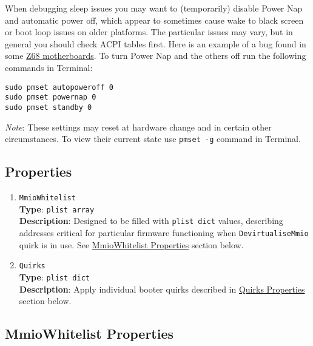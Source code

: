 \documentclass[]{article}
\begin{document}
When debugging sleep issues you may want to (temporarily) disable Power Nap and
automatic power off, which appear to sometimes cause wake to black screen or boot loop
issues on older platforms. The particular issues may vary, but in general you should
check ACPI tables first. Here is an example of a bug found in some
\href{http://www.insanelymac.com/forum/topic/329624-need-cmos-reset-after-sleep-only-after-login/#entry2534645}{Z68 motherboards}.
To turn Power Nap and the others off run the following commands in Terminal:
\begin{lstlisting}[label=powernap, style=ocbash]
sudo pmset autopoweroff 0
sudo pmset powernap 0
sudo pmset standby 0
\end{lstlisting}

\emph{Note}: These settings may reset at hardware change and in certain other circumstances.
To view their current state use \texttt{pmset -g} command in Terminal.

\subsection{Properties}\label{booterprops}

\begin{enumerate}

\item
  \texttt{MmioWhitelist}\\
  \textbf{Type}: \texttt{plist\ array}\\
  \textbf{Description}: Designed to be filled with \texttt{plist\ dict} values,
  describing addresses critical for particular firmware functioning when
  \texttt{DevirtualiseMmio} quirk is in use. See \hyperref[booterpropsmmio]{MmioWhitelist Properties}
  section below.

\item
  \texttt{Quirks}\\
  \textbf{Type}: \texttt{plist\ dict}\\
  \textbf{Description}: Apply individual booter quirks described
  in \hyperref[booterpropsquirks]{Quirks Properties} section below.

\end{enumerate}

\subsection{MmioWhitelist Properties}\label{booterpropsmmio}
\end{document}
